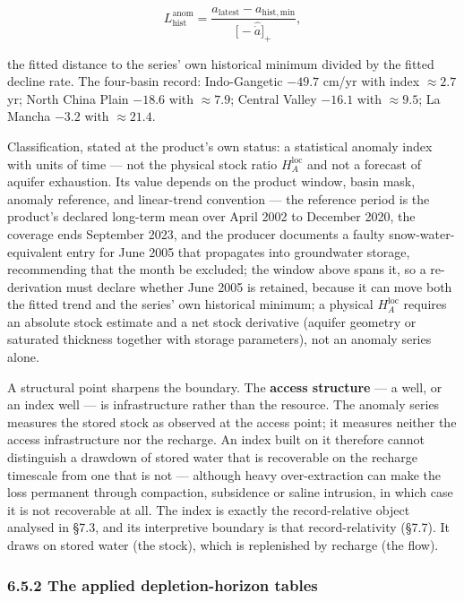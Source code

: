 \documentclass[11pt]{article}
\begin{document}
$$L_{\mathrm{hist}}^{\mathrm{anom}} = \frac{a_{\mathrm{latest}} - a_{\mathrm{hist,min}}}{\bigl[ -\widehat{\dot a} \bigr]_+},$$

 the fitted distance to the series' own historical minimum divided by the fitted decline rate. The four-basin record: Indo-Gangetic \(-49.7\) cm/\allowbreak{}yr with index \(\approx 2.7\) yr; North China Plain \(-18.6\) with \(\approx 7.9\); Central Valley \(-16.1\) with \(\approx 9.5\); La Mancha \(-3.2\) with \(\approx 21.4\).

Classification, stated at the product's own status: a statistical anomaly index with units of time --- not the physical stock ratio \(H_A^{\mathrm{loc}}\) and not a forecast of aquifer exhaustion. Its value depends on the product window, basin mask, anomaly reference, and linear-trend convention --- the reference period is the product's declared long-term mean over April 2002 to December 2020, the coverage ends September 2023, and the producer documents a faulty snow-water-equivalent entry for June 2005 that propagates into groundwater storage, recommending that the month be excluded; the window above spans it, so a re-derivation must declare whether June 2005 is retained, because it can move both the fitted trend and the series' own historical minimum; a physical \(H_A^{\mathrm{loc}}\) requires an absolute stock estimate and a net stock derivative (aquifer geometry or saturated thickness together with storage parameters), not an anomaly series alone.

A structural point sharpens the boundary. The \textbf{access structure} --- a well, or an index well --- is infrastructure rather than the resource. The anomaly series measures the stored stock as observed at the access point; it measures neither the access infrastructure nor the recharge. An index built on it therefore cannot distinguish a drawdown of stored water that is recoverable on the recharge timescale from one that is not --- although heavy over-extraction can make the loss permanent through compaction, subsidence or saline intrusion, in which case it is not recoverable at all. The index is exactly the record-relative object analysed in \S7.3, and its interpretive boundary is that record-relativity (\S7.7). It draws on stored water (the stock), which is replenished by recharge (the flow).

\subsubsection*{6.5.2 The applied depletion-horizon tables}\label{652-the-applied-depletion-horizon-tables}
\end{document}
